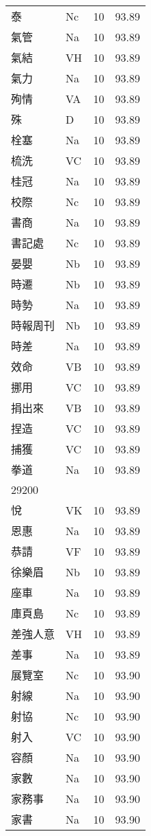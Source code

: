 \documentclass[twocolumn]{book}
\begin{document}
\begin{supertabular}{llrr}
泰 & Nc & 10 &  93.89\\
氣管 & Na & 10 &  93.89\\
氣結 & VH & 10 &  93.89\\
氣力 & Na & 10 &  93.89\\
殉情 & VA & 10 &  93.89\\
殊 & D & 10 &  93.89\\
栓塞 & Na & 10 &  93.89\\
梳洗 & VC & 10 &  93.89\\
桂冠 & Na & 10 &  93.89\\
校際 & Nc & 10 &  93.89\\
書商 & Na & 10 &  93.89\\
書記處 & Nc & 10 &  93.89\\
晏嬰 & Nb & 10 &  93.89\\
時遷 & Nb & 10 &  93.89\\
時勢 & Na & 10 &  93.89\\
時報周刊 & Nb & 10 &  93.89\\
時差 & Na & 10 &  93.89\\
效命 & VB & 10 &  93.89\\
挪用 & VC & 10 &  93.89\\
捐出來 & VB & 10 &  93.89\\
捏造 & VC & 10 &  93.89\\
捕獲 & VC & 10 &  93.89\\
拳道 & Na & 10 &  93.89\\
29200\\
悅 & VK & 10 &  93.89\\
恩惠 & Na & 10 &  93.89\\
恭請 & VF & 10 &  93.89\\
徐樂眉 & Nb & 10 &  93.89\\
座車 & Na & 10 &  93.89\\
庫頁島 & Nc & 10 &  93.89\\
差強人意 & VH & 10 &  93.89\\
差事 & Na & 10 &  93.89\\
展覽室 & Nc & 10 &  93.90\\
射線 & Na & 10 &  93.90\\
射協 & Nc & 10 &  93.90\\
射入 & VC & 10 &  93.90\\
容顏 & Na & 10 &  93.90\\
家數 & Na & 10 &  93.90\\
家務事 & Na & 10 &  93.90\\
家書 & Na & 10 &  93.90\\

\end{supertabular}
\end{document}
